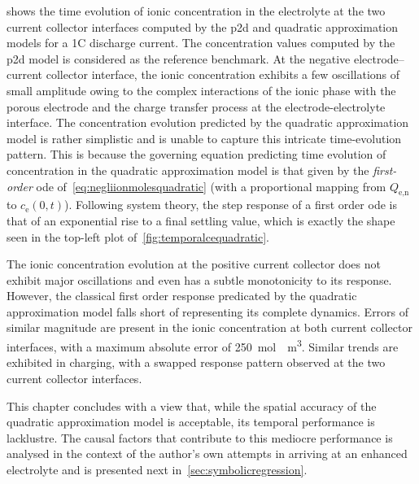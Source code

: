  shows  the time evolution of  ionic concentration
in  the electrolyte  at the  two current  collector interfaces  computed by  the
\gls{p2d} and  quadratic approximation  models for a  1C discharge  current. The
concentration  values computed  by  the  \gls{p2d} model  is  considered as  the
reference benchmark. At the negative electrode--current collector interface, the
ionic  concentration  exhibits  a  few oscillations  of  small  amplitude  owing
to  the complex  interactions  of  the ionic  phase  with  the porous  electrode
and  the charge  transfer process  at the  electrode-electrolyte interface.  The
concentration  evolution  predicted  by  the quadratic  approximation  model  is
rather  simplistic  and  is  unable to  capture  this  intricate  time-evolution
pattern.  This  is because  the  governing  equation predicting  time  evolution
of  concentration  in  the  quadratic  approximation  model  is  that  given  by
the  \emph{first-order}  \gls{ode} of~\cref{eq:negliionmolesquadratic}  (with  a
proportional mapping from $Q_\text{e,n}$ to $c_\text{e}(0,t)$). Following system
theory, the step response  of a first order \gls{ode} is  that of an exponential
rise to a final settling value, which  is exactly the shape seen in the top-left
plot of~\cref{fig:temporalcequadratic}.

The ionic  concentration evolution  at the positive  current collector  does not
exhibit major oscillations  and even has a subtle monotonicity  to its response.
However,  the  classical  first  order  response  predicated  by  the  quadratic
approximation model falls short of representing its complete dynamics. Errors of
similar  magnitude  are present  in  the  ionic  concentration at  both  current
collector  interfaces, with  a maximum  absolute error  of \approx\SI{250}{\mole
\per \meter  \cubed}. Similar trends are  exhibited in charging, with  a swapped
response pattern observed at the two current collector interfaces.

This  chapter concludes  with a  view that,  while the  spatial accuracy  of the
quadratic  approximation  model  is  acceptable,  its  temporal  performance  is
lacklustre. The causal  factors that contribute to this  mediocre performance is
analysed in the context of the author's  own attempts in arriving at an enhanced
electrolyte and is presented next in~\cref{sec:symbolicregression}.

